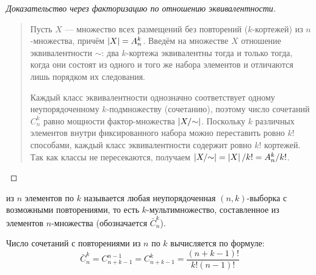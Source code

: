 \begin{proof}[Доказательство через факторизацию по отношению эквивалентности]~\\
    \begin{quote}
        Пусть $X$ --- множество всех размещений без повторений ($k$-кортежей) 
        из $n$-множества, причём $\left| X \right| = A_n^k$. Введём на множестве $X$ 
        отношение эквивалентности $\sim$: два $k$-кортежа эквивалентны 
        тогда и только тогда, когда они состоят из одного и того же набора 
        элементов и отличаются лишь порядком их следования.

        Каждый класс эквивалентности однозначно соответствует одному 
        неупорядоченному $k$-подмножеству (сочетанию), поэтому число 
        сочетаний $C_n^k$ равно мощности фактор-множества $\left| X/{\sim} \right|$. 
        Поскольку $k$ различных элементов внутри фиксированного набора 
        можно переставить ровно $k!$ способами, каждый класс 
        эквивалентности содержит ровно $k!$ кортежей. Так как классы не 
        пересекаются, получаем $\left| X/{\sim} \right| = \left| X \right| / k! = A_n^k / k!$.
    \end{quote}
\end{proof}

\begin{definition}
     из $n$ элементов по $k$ называется 
    любая неупорядоченная $(n, k)$-выборка с возможными повторениями, то 
    есть $k$-мультимножество, составленное из элементов $n$-множества 
    (обозначается $\bar{C}_n^k$).
\end{definition}

\begin{proposition}
    Число сочетаний с повторениями из $n$ по $k$ вычисляется по формуле:
    \begin{equation} \label{eq:comb_rep}
        \bar{C}_n^k = C_{n+k-1}^{n-1} = C_{n+k-1}^k = 
        \frac{(n + k - 1)!}{k!(n - 1)!} \tag{11}
    \end{equation}
\end{proposition}

